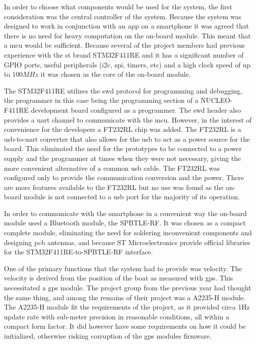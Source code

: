 In order to choose what components would be used for the system, the first consideration was the central controller of the system. Because the system was designed to work in conjunction with an app on a smartphone it was agreed that there is no need for heavy computation on the on-board module. This meant that a \gls{mcu} would be sufficient. Because several of the project members had previous experience with the \gls{st} brand STM32F411RE and it has a significant number of GPIO ports, useful peripherals (\gls{i2c}, \gls{spi}, timers, etc) and a high clock speed of up to $100MHz$ it was chosen as the core of the on-board module. 

The STM32F411RE utilizes the \gls{swd} protocol for programming and debugging, the programmer in this case being the programming section of a NUCLEO-F411RE development board configured as a programmer. The \gls{swd} header also provides a \gls{uart} channel to communicate with the \gls{mcu}. However, in the interest of convenience for the developers a FT232RL chip was added. The FT232RL is a \gls{usb}-to-\gls{uart} converter that also allows for the \gls{usb} to act as a power source for the board. This eliminated the need for the prototypes to be connected to a power supply and the programmer at times when they were not necessary, giving the more convenient alternative of a common \gls{usb} cable.  The FT232RL was configured only to provide the communication conversion and the power. There are more features available to the FT232RL but no use was found as the on-board module is not connected to a \gls{usb} port for the majority of its operation. 

In order to communicate with the smartphone in a convenient way the on-board module used a Bluetooth module, the SPBTLE-RF. It was chosen as a compact complete module, eliminating the need for soldering inconvenient components and designing \gls{pcb} antennas, and because ST Microelectronics provide official libraries for the STM32F411RE-to-SPBTLE-RF interface. 

One of the primary functions that the system had to provide was velocity. The velocity is derived from the position of the boat as measured with \gls{gps}. This necessitated a \gls{gps} module. The project group from the previous year had thought the same thing, and among the remains of their project was a A2235-H module. The A2235-H module fit the requirements of the project, as it provided circa 1Hz update rate with sub-meter precision in reasonable conditions, all within a compact form factor. It did however have some requirements on how it could be initialized, otherwise risking corruption of the \gls{gps} modules firmware. 

